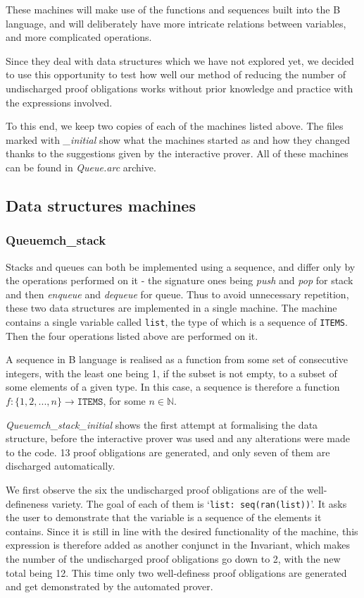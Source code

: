 \documentclass[12pt,journal,duplex]{IEEEtran}
\begin{document}
	These machines will make use of the functions and sequences built into the B language, and will deliberately have more intricate relations between variables, and more complicated operations.

	Since they deal with data structures which we have not explored yet, we decided to use this opportunity to test how well our method of reducing the number of undischarged proof obligations works without prior knowledge and practice with the expressions involved.

	To this end, we keep two copies of each of the machines listed above. The files marked with \emph{\_initial} show what the machines started as and how they changed thanks to the suggestions given by the interactive prover. All of these machines can be found in \emph{Queue.arc} archive.

	\subsection{Data structures machines}
	\subsubsection{Queuemch\_stack}

	Stacks and queues can both be implemented using a sequence, and differ only by the operations performed on it - the signature ones being \textit{push} and \textit{pop} for stack and then \textit{enqueue} and \textit{dequeue} for queue. Thus to avoid unnecessary repetition, these two data structures are implemented in a single machine. The machine contains a single variable called \texttt{list}, the type of which is a sequence of \texttt{ITEMS}. Then the four operations listed above are performed on it.

	A sequence in B language is realised as a function from some set of consecutive integers, with the least one being 1, if the subset is not empty, to a subset of some elements of a given type. In this case, a sequence is therefore a function $f:\{1,2,...,n\} \rightarrow \texttt{ITEMS}$, for some $n \in \mathbb{N}$.

	\emph{Queuemch\_stack\_initial} shows the first attempt at formalising the data structure, before the interactive prover was used and any alterations were made to the code. 13 proof obligations are generated, and only seven of them are discharged automatically.

	We first observe the six the undischarged proof obligations are of the well-defineness variety. The goal of each of them is `\texttt{list: seq(ran(list))}'. It asks the user to demonstrate that the variable is a sequence of the elements it contains. Since it is still in line with the desired functionality of the machine, this expression is therefore added as another conjunct in the Invariant, which makes the number of the undischarged proof obligations go down to 2, with the new total being 12. This time only two well-definess proof obligations are generated and get demonstrated by the automated prover.
\end{document}
